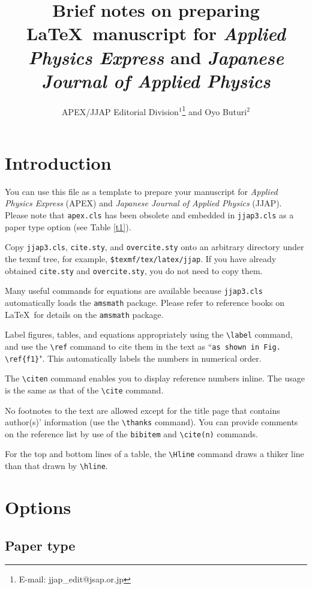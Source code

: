 \documentclass{jbook}
\title{Brief notes on preparing \LaTeX\ manuscript for \textit{Applied Physics Express} and \textit{Japanese Journal of Applied Physics}}
\author{APEX/JJAP Editorial Division$^{1}$\thanks{E-mail: jjap{\_}edit@jsap.or.jp} and Oyo Buturi$^{2}$}
\begin{document}
\maketitle

\section{Introduction}
You can use this file as a template to prepare your manuscript for \textit{Applied Physics Express} (APEX)\cite{apex} and \textit{Japanese Journal of Applied Physics} (JJAP)\cite{jjap,instructions}. Please note that \verb|apex.cls| has been obsolete and embedded in \verb|jjap3.cls| as a paper type option (see Table \ref{t1}).\cite{newversion}

Copy \verb|jjap3.cls|, \verb|cite.sty|, and \verb|overcite.sty| onto an arbitrary directory under the texmf tree, for example, \verb|$texmf/tex/latex/jjap|. If you have already obtained \verb|cite.sty| and \verb|overcite.sty|, you do not need to copy them.

Many useful commands for equations are available because \verb|jjap3.cls| automatically loads the \verb|amsmath| package. Please refer to reference books on \LaTeX\ for details on the \verb|amsmath| package.

Label figures, tables, and equations appropriately using the \verb|\label| command, and use the \verb|\ref| command to cite them in the text as ``\verb|as shown in Fig. \ref{f1}|". This automatically labels the numbers in numerical order.

The \verb|\citen| command enables you to display reference numbers inline. The usage is the same as that of the \verb|\cite| command.

No footnotes to the text are allowed except for the title page that contains author(s)' information (use the \verb|\thanks| command). You can provide  comments on the reference list by use of the \verb|bibitem| and \verb|\cite(n)| commands.

For the top and bottom lines of a table, the \verb|\Hline| command draws a thiker line than that drawn by \verb|\hline|.

\section{Options}

\subsection{Paper type}
\end{document}
